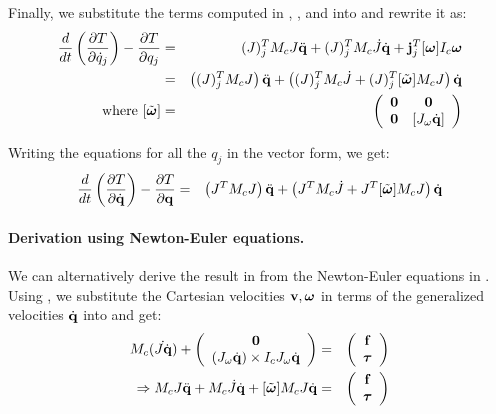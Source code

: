 Finally, we substitute the terms computed in , ,  and  into  and rewrite it as:
\begin{eqnarray}
\label{eq:lageqn_j_final}
\nonumber
\frac{d}{dt} \left ( \frac{\partial T}{\partial \dot{q}_j} \right ) - \frac{\partial T}{\partial q_j} & = & (J)_j^T M_c J \ddot{\mathbf{q}} + (J)_j^T M_c \dot{J} \dot{\mathbf{q}} + \mathbf{j}_j^T[\bm{\omega}]I_c \bm{\omega}\\
\nonumber
& = & \left( (J)_j^T M_c J \right )\ddot{\mathbf{q}} + \left( (J)_j^T M_c \dot{J} + (J)_j^T [\tilde{\bm{\omega}}]M_c J \right )\dot{\mathbf{q}}\\
\mbox{where } [\tilde{\bm{\omega}}] & = &
\left ( 
\begin{array}{cc}
\mathbf{0} & \mathbf{0} \\
\mathbf{0} & [J_\omega \dot{\mathbf{q}}]
\end{array}
\right )
\end{eqnarray}

Writing the equations for all the $q_j$ in the vector form, we get:
\begin{eqnarray}
\label{eq:dyngen_vec}
\frac{d}{dt} \left ( \frac{\partial T}{\partial \dot{\mathbf{q}}} \right ) - \frac{\partial T}{\partial \mathbf{q}} & = & \left( J^T M_c J \right )\ddot{\mathbf{q}} + \left( J^T M_c \dot{J} + J^T [\tilde{\bm{\omega}}]M_c J \right )\dot{\mathbf{q}}
\end{eqnarray}


\paragraph{Derivation using Newton-Euler equations.}
We can alternatively derive the result in  from the Newton-Euler equations in . Using , we substitute the Cartesian velocities $\mathbf{v},\bm{\omega}$ in terms of the generalized velocities $\dot{\mathbf{q}}$ into  and get:
\begin{eqnarray}
\nonumber
M_c (\dot{J\dot{\mathbf{q}}}) + 
\left ( 
\begin{array}{c}
\mathbf{0} \\
(J_\omega \dot{\mathbf{q}}) \times I_c J_\omega \dot{\mathbf{q}}
\end{array}
\right )
& = &
\left ( 
\begin{array}{c}
\mathbf{f} \\
\bm{\tau}
\end{array}
\right )\\
\Rightarrow 
M_c J \ddot{\mathbf{q}} + M_c \dot{J} \dot{\mathbf{q}} + [\tilde{\bm{\omega}}]M_c J \dot{\mathbf{q}} & = & 
\left ( 
\begin{array}{c}
\mathbf{f} \\
\bm{\tau}
\end{array}
\right )
\end{eqnarray}

